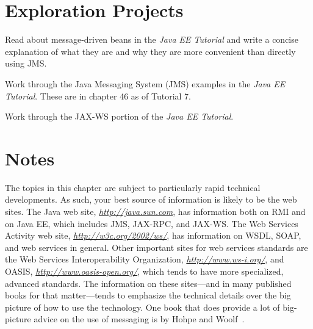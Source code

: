 \section*{Exploration Projects}
\begin{chapterEnumerate}
\item
Read about message-driven beans in the \textit{Java EE Tutorial} and write a
concise explanation of what they are and why they are more convenient
than directly using JMS.
\item
Work through the Java Messaging System (JMS) examples in the \textit{Java EE Tutorial}. These are in chapter 46 as of Tutorial 7.
\item
Work through the JAX-WS portion of the \textit{Java EE Tutorial}.  
\end{chapterEnumerate}


\section*{Notes}
The topics in this chapter are subject to particularly rapid technical
developments.  As such, your best source of information is likely to
be the web sites.  The Java web site, \textit{\url{http://java.sun.com}}, has
information both on RMI and on Java EE, which includes JMS, JAX-RPC, and JAX-WS.
The Web Services Activity web site, \textit{\url{http://w3c.org/2002/ws/}}, has
information on WSDL, SOAP, and web services in general.  Other
important sites for web services standards are the Web Services
Interoperability Organization, \textit{\url{http://www.ws-i.org/}}, and OASIS,
\textit{\url{http://www.oasis-open.org/}}, which tends to have more specialized,
advanced standards.  The information on these sites---and in many
published books for that matter---tends to emphasize the technical
details over the big picture of how to use the technology.  One book
that does provide a lot of big-picture advice on the use of messaging
is by Hohpe and Woolf~\cite{max1157}.

